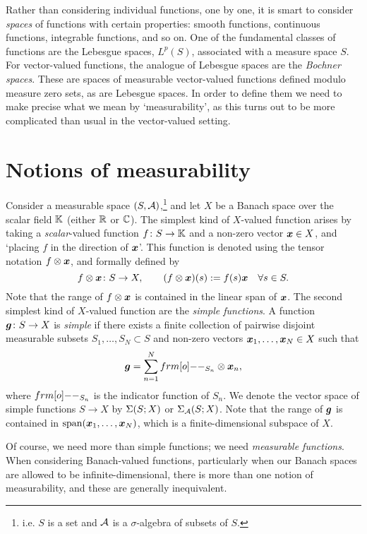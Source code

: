 Rather than considering individual functions, one by one, it is smart to consider \emph{spaces} of functions with certain properties: smooth functions, continuous functions, integrable functions, and so on.
One of the fundamental classes of functions are the Lebesgue spaces, $L^p(S)$, associated with a measure space $S$.
For vector-valued functions, the analogue of Lebesgue spaces are the \emph{Bochner spaces}.
These are spaces of measurable vector-valued functions defined modulo measure zero sets, as are Lebesgue spaces.
In order to define them we need to make precise what we mean by `measurability', as this turns out to be more complicated than usual in the vector-valued setting.

\section{Notions of measurability}

Consider a measurable space $(S,\mathcal{A})$,\footnote{i.e. $S$ is a set and $\mathcal{A}$ is a $\sigma$-algebra of subsets of $S$.} and let $X$ be a Banach space over the scalar field $\mathbb{K}$ (either $\mathbb{R}$ or $\mathbb{C}$).
The simplest kind of $X$-valued function arises by taking a \emph{scalar}-valued function $f \colon S \rightarrow \mathbb{K}$ and a non-zero vector $\bm{x} \in X$, and `placing $f$ in the direction of $\bm{x}$'.
This function is denoted using the tensor notation $f \otimes \bm{x}$, and formally defined by
\begin{equation*}
  f \otimes \bm{x} \colon S \rightarrow X, \qquad (f \otimes \bm{x})(s) := f(s)\bm{x} \quad \forall s \in S.
\end{equation*}
Note that the range of $f \otimes \bm{x}$ is contained in the linear span of $\bm{x}$.
The second simplest kind of $X$-valued function are the \emph{simple functions}.
A function $\bm{g} \colon S \rightarrow X$ is \emph{simple} if there exists a finite collection of pairwise disjoint measurable subsets $S_1,\ldots,S_N \subset S$ and non-zero vectors $\bm{x}_1,\ldots,\bm{x}_N \in X$ such that
\begin{equation}\label{eqn:simple-function-standard-form}
  \mb{g} = \sum_{n=1}^N \1_{S_n} \otimes \mb{x}_n ,
\end{equation}
where $\1_{S_n}$ is the indicator function of $S_n$.
We denote the vector space of simple functions $S \to X$ by $\Sigma(S;X)$ or $\Sigma_{\mathcal{A}}(S;X)$.
Note that the range of $\bm{g}$ is contained in $\mathrm{span}(\bm{x}_1,\ldots,\bm{x}_N)$, which is a finite-dimensional subspace of $X$.

Of course, we need more than simple functions; we need \emph{measurable functions}.
When considering Banach-valued functions, particularly when our Banach spaces are allowed to be infinite-dimensional, there is more than one notion of measurability, and these are generally inequivalent.

